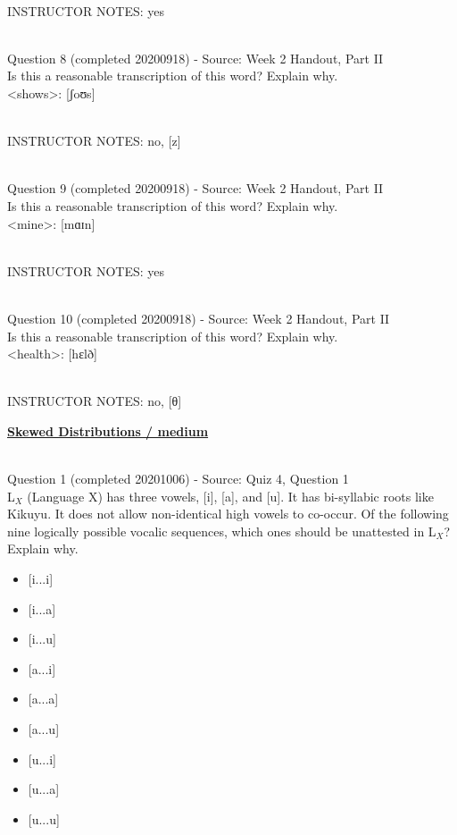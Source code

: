 \documentclass[12pt]{article}
\begin{document}
~\\
INSTRUCTOR NOTES: yes


~\\

{\large Question 8} (completed 20200918) - Source: Week 2 Handout, Part II\\

Is this a reasonable transcription of this word? Explain why.\\

<shows>: {[ʃoʊs]}


~\\
INSTRUCTOR NOTES: no, [z]


~\\

{\large Question 9} (completed 20200918) - Source: Week 2 Handout, Part II\\

Is this a reasonable transcription of this word? Explain why.\\

<mine>: {[mɑɪn]}


~\\
INSTRUCTOR NOTES: yes


~\\

{\large Question 10} (completed 20200918) - Source: Week 2 Handout, Part II\\

Is this a reasonable transcription of this word? Explain why.\\

<health>: {[hɛlð]}


~\\
INSTRUCTOR NOTES: no, [θ]


\newpage\textbf{\underline{\huge Skewed Distributions / medium\\}}

~\\

{\large Question 1} (completed 20201006) - Source: Quiz 4, Question 1\\

L$_X$ (Language X) has three vowels, [i], [a], and [u]. It has bi-syllabic roots like Kikuyu. It does not allow non-identical high vowels to co-occur. Of the following nine logically possible vocalic sequences, which ones should be unattested in L$_X$? Explain why.\\

\begin{itemize} \item {[i...i]} \item {[i...a]} \item {[i...u]} \item {[a...i]} \item {[a...a]} \item {[a...u]} \item {[u...i]} \item {[u...a]} \item {[u...u]} \end{itemize}
\end{document}
